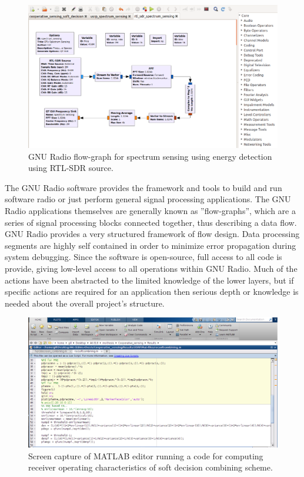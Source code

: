 \begin{figure}[ht!]
	\centering
	\includegraphics[width=\textwidth,keepaspectratio]{images/Gill/figs/gnuflowgraph.eps}
    \caption{GNU Radio flow-graph for spectrum sensing using energy detection using RTL-SDR source.}
\label{gnuradioflowgraph}      
\end{figure}

The GNU Radio software provides the framework and tools to build and run software radio or just perform general signal processing applications. The GNU Radio applications themselves are generally known as ''flow-graphs'', which are a series of signal processing blocks connected together, thus describing a data flow. GNU Radio provides a very structured framework of flow design. Data processing segments are highly self contained in order to minimize error propagation during system debugging. Since the software is open-source, full access to all code is provide, giving low-level access to all operations within GNU Radio. Much of the actions have been abstracted to the limited knowledge of the lower layers, but if specific actions are required for an application then serious depth or knowledge is needed about the overall project’s structure.

\begin{figure}[ht!]
	\centering
	\includegraphics[width=\textwidth,keepaspectratio]{images/Gill/figs/matlab.eps}
    \caption{Screen capture of MATLAB editor running a code for computing receiver operating characteristics of soft decision combining scheme.}
\label{matlab}      
\end{figure}


